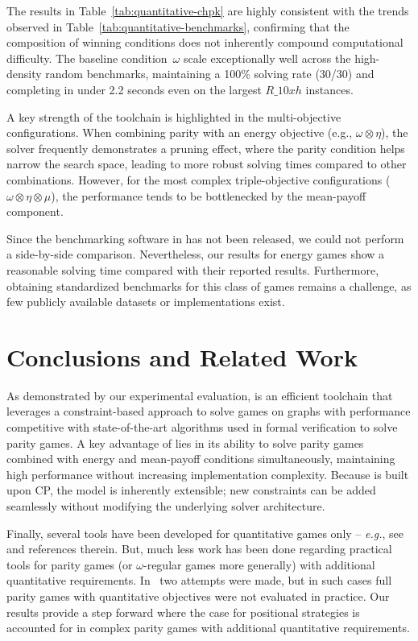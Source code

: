 \documentclass[runningheads]{llncs}
\begin{document}
The results in Table~\ref{tab:quantitative-chpk} are highly consistent with the trends observed in Table~\ref{tab:quantitative-benchmarks}, confirming that the composition of winning conditions does not inherently compound computational difficulty. The baseline condition~$\omega$ scale exceptionally well across the high-density random benchmarks, maintaining a 100\% solving rate (30/30) and completing in under 2.2 seconds even on the largest $R\_10xh$ instances.

A key strength of the \nocq toolchain is highlighted in the multi-objective configurations. When combining parity with an energy objective (e.g., $\omega \otimes \eta$), the solver frequently demonstrates a pruning effect, where the parity condition helps narrow the search space, leading to more robust solving times compared to other combinations. However, for the most complex triple-objective configurations ($\omega \otimes \eta \otimes \mu$), the performance tends to be bottlenecked by the mean-payoff component.

Since the benchmarking software in \cite{Chaloupka:2011} has not been released, we could not perform a side-by-side comparison. Nevertheless, our results for energy games show a reasonable solving time compared with their reported results.  Furthermore, obtaining standardized benchmarks for this class of games remains a challenge, as few publicly available datasets or implementations exist.

\section{Conclusions and Related Work} 

As demonstrated by our experimental evaluation, \nocq is an efficient toolchain that leverages a constraint-based approach to solve games on graphs with performance competitive with state-of-the-art algorithms used in formal verification to solve parity games. A key advantage of \nocq lies in its ability to solve parity games combined with energy and mean-payoff conditions simultaneously, maintaining high performance without increasing implementation complexity.
%
Because \nocq is built upon CP, the model is inherently extensible; new constraints can be added seamlessly without modifying the underlying solver architecture. 

Finally, several tools have been developed for quantitative games only -- {\em e.g.}, see~\cite{BenerecettiDM24} and references therein. But, much less work has been done regarding practical tools for parity games (or $\omega$-regular games more generally) with additional quantitative requirements. 
%
In~\cite{ChatterjeeHJS11,DziadekFS25} two attempts were made, but in such cases full parity games with quantitative objectives were not evaluated in practice. Our results provide a step forward where the case for positional strategies is accounted for in complex parity games with additional quantitative requirements.  
\end{document}
